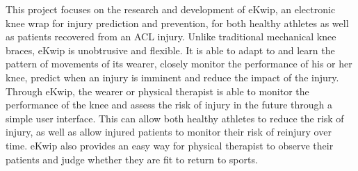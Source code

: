 This project focuses on the research and development of eKwip, an electronic knee wrap for injury prediction and prevention, for both healthy athletes as well as patients recovered from an ACL injury. Unlike traditional mechanical knee braces, eKwip is unobtrusive and flexible. It is able to adapt to and learn the pattern of movements of its wearer, closely monitor the performance of his or her knee, predict when an injury is imminent and reduce the impact of the injury. Through eKwip, the wearer or physical therapist is able to monitor the performance of the knee and assess the risk of injury in the future through a simple user interface. This can allow both healthy athletes to reduce the risk of injury, as well as allow injured patients to monitor their risk of reinjury over time. eKwip also provides an easy way for physical therapist to observe their patients and judge whether they are fit to return to sports.
